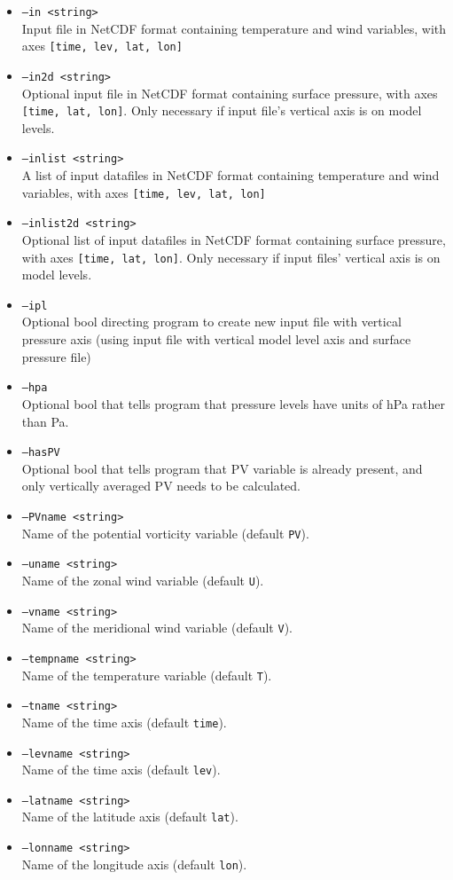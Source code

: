 \documentclass{article}
\begin{document}
\begin{itemize}
\item[]\texttt{--in <string>} \\ Input file in NetCDF format containing temperature and wind variables, with axes \texttt{[time, lev, lat, lon]}
\item[]\texttt{--in2d <string>} \\ Optional input file in NetCDF format containing surface pressure, with axes \texttt{[time, lat, lon]}. Only necessary if input file's vertical axis is on model levels.
\item[]\texttt{--inlist <string>} \\ A list of input datafiles in NetCDF format containing temperature and wind variables, with axes \texttt{[time, lev, lat, lon]}
\item[]\texttt{--inlist2d <string>} \\ Optional list of input datafiles in NetCDF format containing surface pressure, with axes \texttt{[time, lat, lon]}. Only necessary if input files' vertical axis is on model levels.
\item[]\texttt{--ipl}\\ Optional bool directing program to create new input file with vertical pressure axis (using input file with vertical model level axis and surface pressure file)
\item[]\texttt{--hpa} \\ Optional bool that tells program that pressure levels have units of hPa rather than Pa.
\item[]\texttt{--hasPV} \\ Optional bool that tells program that PV variable is already present, and only vertically averaged PV needs to be calculated.
\item[] \texttt{--PVname <string>}\\Name of the potential vorticity variable (default \texttt{PV}).
\item[] \texttt{--uname <string>}\\Name of the zonal wind variable (default \texttt{U}).
\item[] \texttt{--vname <string>}\\Name of the meridional wind variable (default \texttt{V}).
\item[] \texttt{--tempname <string>}\\Name of the temperature variable (default \texttt{T}).
\item[] \texttt{--tname <string>}\\Name of the time axis (default \texttt{time}).
\item[] \texttt{--levname <string>}\\Name of the time axis (default \texttt{lev}).
\item[]\texttt{--latname <string>}\\Name of the latitude axis (default \texttt{lat}).
\item[]\texttt{--lonname <string>}\\Name of the longitude axis (default \texttt{lon}).
\end{itemize}
\end{document}
